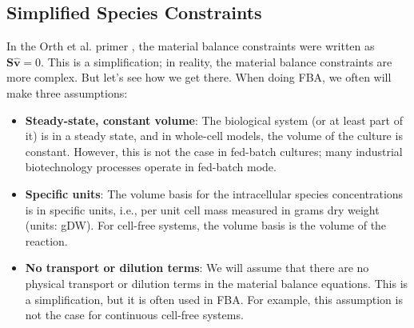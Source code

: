 \documentclass{article}[11pt]
\begin{document}
\subsection{Simplified Species Constraints}
In the Orth et al. primer \cite{Orth:2010aa}, the material balance constraints were written as $\mathbf{S}\hat{\mathbf{v}} = 0$. 
This is a simplification; in reality, the material balance constraints are more complex. But let's see how we get there.
When doing FBA, we often will make three assumptions:
\begin{itemize}[leftmargin=16pt]
\item{\textbf{Steady-state, constant volume}: The biological system (or at least part of it) is in a steady state, and in whole-cell models, the volume of the culture is constant. However, this is not the case in fed-batch cultures; many industrial biotechnology processes operate in fed-batch mode.}
\item{\textbf{Specific units}: The volume basis for the intracellular species concentrations is in specific units, i.e., per unit cell mass measured in grams dry weight (units: gDW). For cell-free systems, the volume basis is the volume of the reaction.}
\item{\textbf{No transport or dilution terms}: We will assume that there are no physical transport or dilution terms in the material balance equations. This is a simplification, but it is often used in FBA. For example, this assumption is not the case for continuous cell-free systems.}
\end{itemize}
\end{document}
